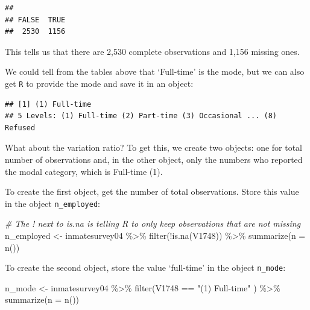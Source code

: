 \documentclass[
]{book}
\newenvironment{Shaded}{\begin{snugshade}}{\end{snugshade}}
\newcommand{\AttributeTok}[1]{\textcolor[rgb]{0.77,0.63,0.00}{#1}}
\newcommand{\CommentTok}[1]{\textcolor[rgb]{0.56,0.35,0.01}{\textit{#1}}}
\newcommand{\ConstantTok}[1]{\textcolor[rgb]{0.00,0.00,0.00}{#1}}
\newcommand{\FunctionTok}[1]{\textcolor[rgb]{0.00,0.00,0.00}{#1}}
\newcommand{\NormalTok}[1]{#1}
\newcommand{\OtherTok}[1]{\textcolor[rgb]{0.56,0.35,0.01}{#1}}
\newcommand{\SpecialCharTok}[1]{\textcolor[rgb]{0.00,0.00,0.00}{#1}}
\newcommand{\StringTok}[1]{\textcolor[rgb]{0.31,0.60,0.02}{#1}}
\begin{document}
\begin{verbatim}
## 
## FALSE  TRUE 
##  2530  1156
\end{verbatim}

This tells us that there are 2,530 complete observations and 1,156 missing ones.

We could tell from the tables above that `Full-time' is the mode, but we can also get \texttt{R} to provide the mode and save it in an object:

\begin{Shaded}
\end{Shaded}

\begin{verbatim}
## [1] (1) Full-time
## 5 Levels: (1) Full-time (2) Part-time (3) Occasional ... (8) Refused
\end{verbatim}

What about the variation ratio? To get this, we create two objects: one for total number of observations and, in the other object, only the numbers who reported the modal category, which is Full-time (1).

To create the first object, get the number of total observations. Store this value in the object \texttt{n\_employed}:

\begin{Shaded}
\begin{Highlighting}[]
\CommentTok{\# The \textquotesingle{}!\textquotesingle{} next to \textquotesingle{}is.na\textquotesingle{} is telling R to only keep observations that are not missing}
\NormalTok{n\_employed }\OtherTok{\textless{}{-}}\NormalTok{ inmatesurvey04 }\SpecialCharTok{\%\textgreater{}\%} 
  \FunctionTok{filter}\NormalTok{(}\SpecialCharTok{!}\FunctionTok{is.na}\NormalTok{(V1748)) }\SpecialCharTok{\%\textgreater{}\%} 
  \FunctionTok{summarize}\NormalTok{(}\AttributeTok{n =} \FunctionTok{n}\NormalTok{())}
\end{Highlighting}
\end{Shaded}

To create the second object, store the value `full-time' in the object \texttt{n\_mode}:

\begin{Shaded}
\begin{Highlighting}[]
\NormalTok{n\_mode }\OtherTok{\textless{}{-}}\NormalTok{ inmatesurvey04 }\SpecialCharTok{\%\textgreater{}\%} 
  \FunctionTok{filter}\NormalTok{(V1748 }\SpecialCharTok{==} \StringTok{"(1) Full{-}time"}\NormalTok{ ) }\SpecialCharTok{\%\textgreater{}\%} 
  \FunctionTok{summarize}\NormalTok{(}\AttributeTok{n =} \FunctionTok{n}\NormalTok{()) }
\end{Highlighting}
\end{Shaded}
\end{document}
